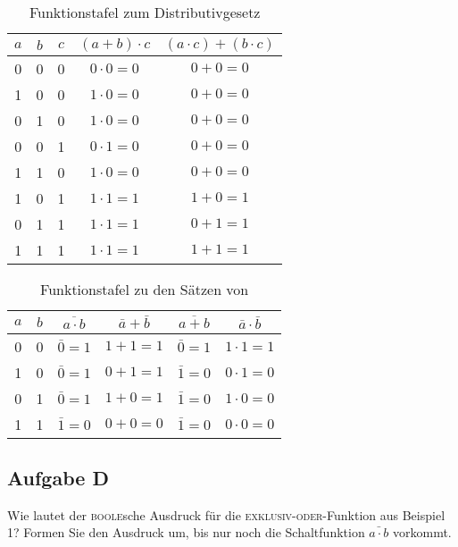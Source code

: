 \begin{table}[htbp]
    \centering
    \begin{tabular}{ccc|c|c}
        $a$ & $b$ & $c$ & $(a + b) \cdot c$ & $(a \cdot c) + (b \cdot c)$
        \\
        \hline
        0 & 0 & 0 & $0 \cdot 0 = 0$ & $0 + 0 = 0$\\
        1 & 0 & 0 & $1 \cdot 0 = 0$ & $0 + 0 = 0$\\
        0 & 1 & 0 & $1 \cdot 0 = 0$ & $0 + 0 = 0$\\
        0 & 0 & 1 & $0 \cdot 1 = 0$ & $0 + 0 = 0$\\
        1 & 1 & 0 & $1 \cdot 0 = 0$ & $0 + 0 = 0$\\
        1 & 0 & 1 & $1 \cdot 1 = 1$ & $1 + 0 = 1$\\
        0 & 1 & 1 & $1 \cdot 1 = 1$ & $0 + 1 = 1$\\
        1 & 1 & 1 & $1 \cdot 1 = 1$ & $1 + 1 = 1$
    \end{tabular}
    \caption{%
        Funktionstafel zum Distributivgesetz
    }
    \label{tab:Aufgabe_C_dist}
\end{table}

\begin{table}[htbp]
    \centering
    \begin{tabular}{cc|cc|cc}
        $a$ & $b$ & $\overline{a \cdot b}$ & $\bar a + \bar b$ & $\overline{a +
        b}$ & $\bar a \cdot \bar b$\\
        \hline
        0 & 0 & $\bar 0 = 1$ & $1 + 1 = 1$ & $\bar 0 = 1$ & $1 \cdot 1 = 1$\\
        1 & 0 & $\bar 0 = 1$ & $0 + 1 = 1$ & $\bar 1 = 0$ & $0 \cdot 1 = 0$\\
        0 & 1 & $\bar 0 = 1$ & $1 + 0 = 1$ & $\bar 1 = 0$ & $1 \cdot 0 = 0$\\
        1 & 1 & $\bar 1 = 0$ & $0 + 0 = 0$ & $\bar 1 = 0$ & $0 \cdot 0 = 0$
    \end{tabular}
    \caption{%
        Funktionstafel zu den Sätzen von 
    }
    \label{tab:Aufgabe_C_demo}
\end{table}

\FloatBarrier
\subsection{Aufgabe D} 

\begin{problem}
    Wie lautet der \textsc{boole}sche Ausdruck für die
    \textsc{exklusiv-oder}-Funktion aus Beispiel 1? Formen Sie den Ausdruck um,
    bis nur noch die Schaltfunktion $\bar{a \cdot b}$ vorkommt.
\end{problem}

